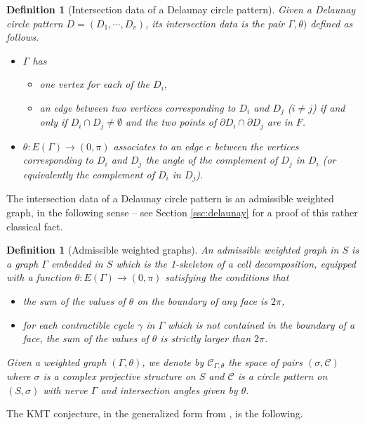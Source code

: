 \documentclass[notitlepage,twoside,a4paper]{amsart}
\newtheorem{definition}[theorem]{\rm\bf Definition}
\theoremstyle{named}
\newcommand{\cC}{{\mathcal C}}
\begin{document}
\begin{definition}[Intersection data of a Delaunay circle pattern]
  Given a Delaunay circle pattern $D=(D_1, \cdots, D_v)$, its {\em intersection data} is the pair $\Gamma,\theta)$ defined as follows.
  \begin{itemize}
  \item $\Gamma$ has
    \begin{itemize}
    \item one vertex for each of the $D_i$,
    \item an edge between two vertices corresponding to $D_i$ and $D_j$ ($i\neq j$) if and only if $D_i\cap D_j\neq \emptyset$ and the two points of $\partial D_i\cap \partial D_j$ are in $F$.
    \end{itemize}
  \item $\theta:E(\Gamma)\to (0,\pi)$ associates to an edge $e$ between the vertices corresponding to $D_i$ and $D_j$ the angle of the complement of $D_j$ in $D_i$ (or equivalently the complement of $D_i$ in $D_j$).
  \end{itemize}
\end{definition}

The intersection data of a Delaunay circle pattern is an admissible weighted graph, in the following sense -- see Section \ref{ssc:delaunay} for a proof of this rather classical fact.

\begin{definition}[Admissible weighted graphs] \label{df:weighted}
  An {\em admissible weighted graph} in $S$ is a graph $\Gamma$ embedded in $S$ which is the 1-skeleton of a cell decomposition, equipped with a function $\theta:E(\Gamma)\to (0,\pi)$ satisfying the conditions that
  \begin{itemize}
  \item the sum of the values of $\theta$ on the boundary of any face is $2\pi$,
  \item for each contractible cycle $\gamma$ in $\Gamma$ which is not contained in the boundary of a face, the sum of the values of $\theta$ is strictly larger than $2\pi$. 
  \end{itemize}
  Given a weighted graph $(\Gamma,\theta)$, we denote by $\cC_{\Gamma,\theta}$ the space of pairs $(\sigma, \cC)$ where $\sigma$ is a complex projective structure on $S$ and $\cC$ is a circle pattern on $(S,\sigma)$ with nerve $\Gamma$ and intersection angles given by $\theta$.
\end{definition}

The KMT conjecture, in the generalized form from \cite{delaunay}, is the following.
\end{document}
